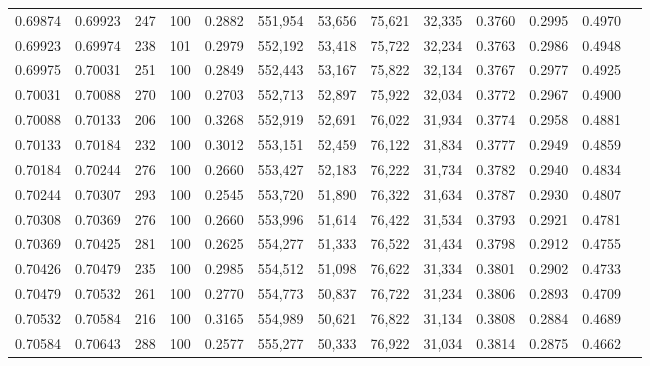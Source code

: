 \begin{tabular}{rrrrrrrrrrrrr}
0.69874 & 0.69923 &   247 & 100 &                                     0.2882 & 551,954 &  53,656 &  75,621 &  32,335 & 0.3760 & 0.2995 & 0.4970 \\
0.69923 & 0.69974 &   238 & 101 &                                     0.2979 & 552,192 &  53,418 &  75,722 &  32,234 & 0.3763 & 0.2986 & 0.4948 \\
0.69975 & 0.70031 &   251 & 100 &                                     0.2849 & 552,443 &  53,167 &  75,822 &  32,134 & 0.3767 & 0.2977 & 0.4925 \\
0.70031 & 0.70088 &   270 & 100 &                                     0.2703 & 552,713 &  52,897 &  75,922 &  32,034 & 0.3772 & 0.2967 & 0.4900 \\
0.70088 & 0.70133 &   206 & 100 &                                     0.3268 & 552,919 &  52,691 &  76,022 &  31,934 & 0.3774 & 0.2958 & 0.4881 \\
0.70133 & 0.70184 &   232 & 100 &                                     0.3012 & 553,151 &  52,459 &  76,122 &  31,834 & 0.3777 & 0.2949 & 0.4859 \\
0.70184 & 0.70244 &   276 & 100 &                                     0.2660 & 553,427 &  52,183 &  76,222 &  31,734 & 0.3782 & 0.2940 & 0.4834 \\
0.70244 & 0.70307 &   293 & 100 &                                     0.2545 & 553,720 &  51,890 &  76,322 &  31,634 & 0.3787 & 0.2930 & 0.4807 \\
0.70308 & 0.70369 &   276 & 100 &                                     0.2660 & 553,996 &  51,614 &  76,422 &  31,534 & 0.3793 & 0.2921 & 0.4781 \\
0.70369 & 0.70425 &   281 & 100 &                                     0.2625 & 554,277 &  51,333 &  76,522 &  31,434 & 0.3798 & 0.2912 & 0.4755 \\
0.70426 & 0.70479 &   235 & 100 &                                     0.2985 & 554,512 &  51,098 &  76,622 &  31,334 & 0.3801 & 0.2902 & 0.4733 \\
0.70479 & 0.70532 &   261 & 100 &                                     0.2770 & 554,773 &  50,837 &  76,722 &  31,234 & 0.3806 & 0.2893 & 0.4709 \\
0.70532 & 0.70584 &   216 & 100 &                                     0.3165 & 554,989 &  50,621 &  76,822 &  31,134 & 0.3808 & 0.2884 & 0.4689 \\
0.70584 & 0.70643 &   288 & 100 &                                     0.2577 & 555,277 &  50,333 &  76,922 &  31,034 & 0.3814 & 0.2875 & 0.4662 \\

\end{tabular}
